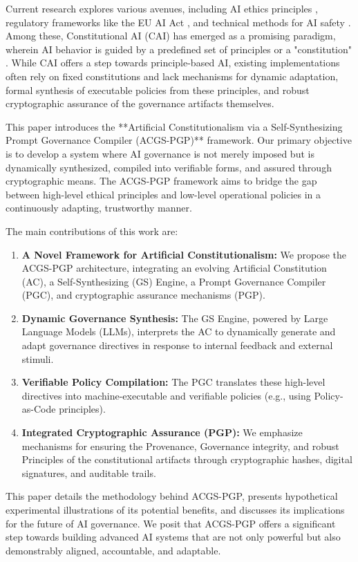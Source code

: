 \documentclass[sigconf,review,screen]{acmart}
\begin{document}
Current research explores various avenues, including AI ethics principles \cite{jobin2019global}, regulatory frameworks like the EU AI Act \cite{europeancommission2021aiact}, and technical methods for AI safety \cite{amodei2016concrete}. Among these, Constitutional AI (CAI) has emerged as a promising paradigm, wherein AI behavior is guided by a predefined set of principles or a "constitution" \cite{bai2022constitutional}. While CAI offers a step towards principle-based AI, existing implementations often rely on fixed constitutions and lack mechanisms for dynamic adaptation, formal synthesis of executable policies from these principles, and robust cryptographic assurance of the governance artifacts themselves.

This paper introduces the **Artificial Constitutionalism via a Self-Synthesizing Prompt Governance Compiler (ACGS-PGP)** framework. Our primary objective is to develop a system where AI governance is not merely imposed but is dynamically synthesized, compiled into verifiable forms, and assured through cryptographic means. The ACGS-PGP framework aims to bridge the gap between high-level ethical principles and low-level operational policies in a continuously adapting, trustworthy manner.

The main contributions of this work are:
\begin{enumerate}
    \item \textbf{A Novel Framework for Artificial Constitutionalism:} We propose the ACGS-PGP architecture, integrating an evolving Artificial Constitution (AC), a Self-Synthesizing (GS) Engine, a Prompt Governance Compiler (PGC), and cryptographic assurance mechanisms (PGP).
    \item \textbf{Dynamic Governance Synthesis:} The GS Engine, powered by Large Language Models (LLMs), interprets the AC to dynamically generate and adapt governance directives in response to internal feedback and external stimuli.
    \item \textbf{Verifiable Policy Compilation:} The PGC translates these high-level directives into machine-executable and verifiable policies (e.g., using Policy-as-Code principles).
    \item \textbf{Integrated Cryptographic Assurance (PGP):} We emphasize mechanisms for ensuring the Provenance, Governance integrity, and robust Principles of the constitutional artifacts through cryptographic hashes, digital signatures, and auditable trails.
\end{enumerate}
This paper details the methodology behind ACGS-PGP, presents hypothetical experimental illustrations of its potential benefits, and discusses its implications for the future of AI governance. We posit that ACGS-PGP offers a significant step towards building advanced AI systems that are not only powerful but also demonstrably aligned, accountable, and adaptable.
\end{document}

